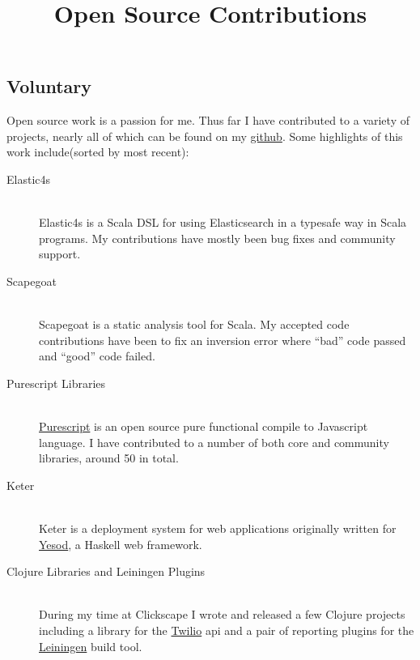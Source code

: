 \documentclass[margintitle,line]{res}
\renewcommand{\subsection}[1]{\section{\normalfont #1}}
\begin{document}
\begin{resume}
%
\subsection{Voluntary}

\title{Open Source Contributions}
\begin{position}
Open source work is a passion for me. Thus far I have contributed to a variety
of projects, nearly all of which can be found on my
\href{http://github.com/telser}{github}. Some highlights of this work
include(sorted by most recent):
\begin{description}
\item[Elastic4s] \hfill \\
  Elastic4s is a Scala DSL for using Elasticsearch in a typesafe way in Scala
  programs. My contributions have mostly been bug fixes and community support.
\item[Scapegoat] \hfill \\
  Scapegoat is a static analysis tool for Scala. My accepted code contributions
  have been to fix an inversion error where ``bad'' code passed and ``good''
  code failed.
\item[Purescript Libraries] \hfill \\
  \href{http://www.purescript.org/}{Purescript} is an
  open source pure functional compile to Javascript language. I have contributed
  to a number of both core and community libraries, around 50 in total.
\item[Keter] \hfill \\
  Keter is a deployment system for web applications originally
  written for \href{http://www.yesodweb.com/}{Yesod}, a Haskell web framework.
\item[Clojure Libraries and Leiningen Plugins] \hfill \\
  During my time at Clickscape I wrote and released a few Clojure projects
  including a library for the \href{https://www.twilio.com/}{Twilio} api and
  a pair of reporting plugins for the \href{http://leiningen.org/}{Leiningen} build tool.
\end{description}
\end{position}


\end{resume}
\end{document}

